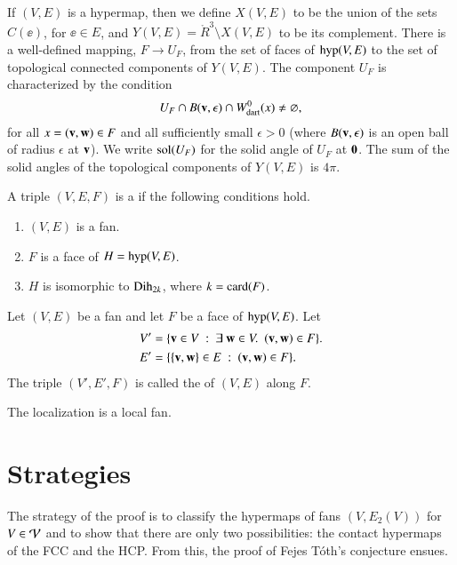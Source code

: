 \documentclass{llncs}
\def\op#1{{\hbox{#1}}}
\begin{document}
If $(V,E)$ is a hypermap, then we
define $X(V,E)$ to be the union of the sets $C(\ee)$, for $\ee\in E$,
and $Y(V,E) = \ring{R}^3 \setminus X(V,E)$ to be its complement.  There is
a well-defined mapping, $F\to U_F$, from the set of faces of $\op{hyp}(V,E)$ to the set of 
topological
connected components of $Y(V,E)$.  The component $U_F$ is characterized by the condition
\[
U_F \cap B({\mathbf v},\epsilon) \cap W^0_{\text{dart}}(x)\ne\varnothing,
\]
for all $x=({\mathbf v},{\mathbf w})\in F$ and all sufficiently small $\epsilon>0$ (where $B({\mathbf v},\epsilon)$ is
an open ball of radius $\epsilon$ at ${\mathbf v}$).
 We write $\op{sol}(U_F)$ for the solid
angle of $U_F$ at ${\mathbf 0}$.  The sum of the solid angles of the topological components
of $Y(V,E)$ is $4\pi$.

\begin{definition} \label{def:convex-local}
A triple $(V,E,F)$ is a  if the following conditions hold.
\begin{enumerate} 
\item $(V,E)$ is a fan.
\item  $F$ is a face of $H = \op{hyp}(V,E)$.
\item  $H$ is isomorphic to $\op{Dih}_{2k}$, where $k =
\card(F)$.
\end{enumerate}
\end{definition}
%

\begin{definition}[localization]
\hspace{-3pt}
 Let $(V,E)$ be a fan and let $F$ be
a face of $\op{hyp}(V,E)$.  Let
\begin{align*}
V' &= \{{\mathbf v}\in V \ :\  \exists~{\mathbf w}\in V.~~({\mathbf v},{\mathbf w})\in F\}.\\
E' &= \{\{{\mathbf v},{\mathbf w}\} \in E\ :\  ({\mathbf v},{\mathbf w})\in F\}.
\end{align*}
The triple $(V',E',F)$ is called the  of $(V,E)$ along $F$.
\end{definition}
%

The localization is a local fan.

\section{Strategies}

The strategy of the proof is to classify the hypermaps of 
fans $(V,E_2(V))$ for $V\in {\mathcal V}$ and to show that there are only two
possibilities: the contact hypermaps of the FCC and the HCP.  From
this, the proof of Fejes T\'oth's conjecture ensues.
\end{document}
